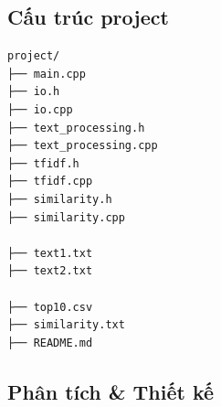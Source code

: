 \subsection{Cấu trúc project}

\begin{lstlisting}
project/
├── main.cpp
├── io.h
├── io.cpp
├── text_processing.h
├── text_processing.cpp
├── tfidf.h
├── tfidf.cpp
├── similarity.h
├── similarity.cpp

├── text1.txt
├── text2.txt

├── top10.csv
├── similarity.txt
├── README.md
\end{lstlisting}

\subsection{Phân tích \& Thiết kế}


